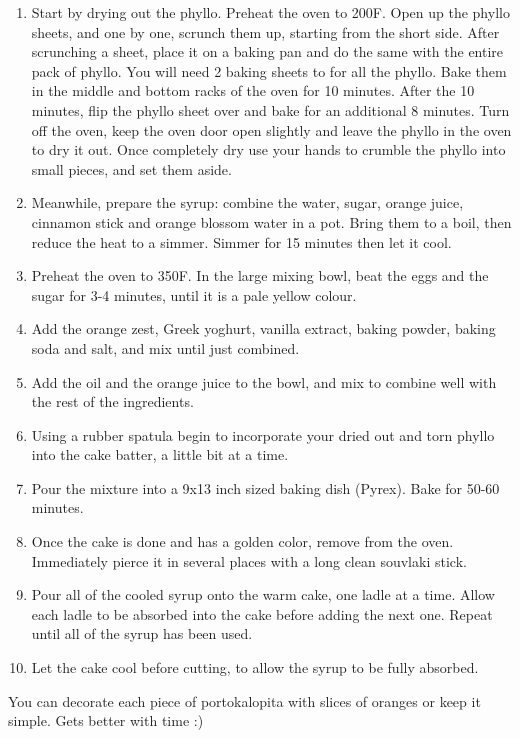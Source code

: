 \begin{enumerate}
    \item Start by drying out the phyllo. Preheat the oven to 200\degree F. Open up the phyllo sheets, and one by one, scrunch them up, starting from the short side. After scrunching a sheet, place it on a baking pan and do the same with the entire pack of phyllo. You will need 2 baking sheets to for all the phyllo. Bake them in the middle and bottom racks of the oven for 10 minutes. After the 10 minutes, flip the phyllo sheet over and bake for an additional 8 minutes. Turn off the oven, keep the oven door open slightly and leave the phyllo in the oven to dry it out. Once completely dry use your hands to crumble the phyllo into small pieces, and set them aside.
    \item Meanwhile, prepare the syrup: combine the water, sugar, orange juice, cinnamon stick and orange blossom water in a pot. Bring them to a boil, then reduce the heat to a simmer. Simmer for 15 minutes then let it cool.
    \item Preheat the oven to 350\degree F. In the large mixing bowl, beat the eggs and the sugar for 3-4 minutes, until it is a pale yellow colour.
    \item Add the orange zest, Greek yoghurt, vanilla extract, baking powder, baking soda and salt, and mix until just combined.
    \item Add the oil and the orange juice to the bowl, and mix to combine well with the rest of the ingredients.
    \item Using a rubber spatula begin to incorporate your dried out and torn phyllo into the cake batter, a little bit at a time.
    \item Pour the mixture into a 9x13 inch sized baking dish (Pyrex). Bake for 50-60 minutes.
    \item Once the cake is done and has a golden color, remove from the oven. Immediately pierce it in several places with a long clean souvlaki stick. \item Pour all of the cooled syrup onto the warm cake, one ladle at a time. Allow each ladle to be absorbed into the cake before adding the next one. Repeat until all of the syrup has been used.
    \item Let the cake cool before cutting, to allow the syrup to be fully absorbed.
\end{enumerate}

You can decorate each piece of portokalopita with slices of oranges or keep it simple. Gets better with time :)


